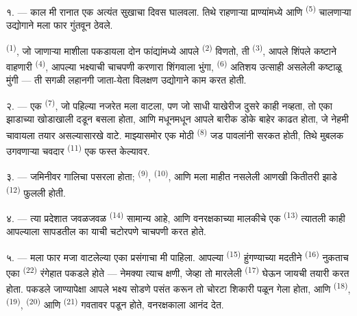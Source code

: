 \VUsaut{3.0mm}
\VUsaut{3.0mm}

\VUsaut{3.0mm}

१. --- काल मी रानात एक अत्यंत सुखाचा दिवस घालवला. तिथे राहणाऱ्या प्राण्यांमध्ये आणि
 \textsuperscript{(5)} चालणाऱ्या उद्योगाने मला फार गुंतवून ठेवले.

 \textsuperscript{(1)}, जो जाणाऱ्या माशीला पकडायला दोन फांद्यांमध्ये आपले
 \textsuperscript{(2)} विणतो, ती  \textsuperscript{(3)}, आपले शिंपले
कष्टाने वाहणारी  \textsuperscript{(4)}, आपल्या भक्ष्याची चाचपणी करणारा
शिंगवाला भुंगा,  \textsuperscript{(6)} अतिशय उत्साही असलेली कष्टाळू मुंगी —
ती सगळी लहानगी जाता-येता विलक्षण उद्योगाने काम करत होती.

२. --- एक  \textsuperscript{(7)}, जो पहिल्या नजरेत मला  वाटला, पण जो
साधी  याखेरीज दुसरे काही नव्हता, तो एका झाडाच्या खोडाखाली दडून बसला होता, आणि
मधूनमधून आपले बारीक डोके बाहेर काढत होता, जे नेहमी चावायला तयार असल्यासारखे वाटे. माझ्यासमोर
एक मोठी  \textsuperscript{(8)} जड पावलांनी सरकत होती, तिथे मुबलक
उगवणाऱ्या चवदार  \textsuperscript{(11)} एक फस्त केल्यावर.

३. --- जमिनीवर  गालिचा पसरला होता; 
\textsuperscript{(9)},  \textsuperscript{(10)}, आणि मला माहीत नसलेली आणखी
कितीतरी झाडे  \textsuperscript{(12)} फुलली होती.

४. --- त्या प्रदेशात  जवळजवळ  \textsuperscript{(14)} सामान्य
आहे, आणि वनरक्षकाच्या मालकीचे एक  \textsuperscript{(13)} त्यातली काही
आपल्याला सापडतील का याची चटोरपणे चाचपणी करत होते.

\VUsaut{3.0mm}
\VUsaut{3.0mm}

५. --- मला फार मजा वाटलेल्या एका प्रसंगाचा  मी पाहिला. आपल्या
 \textsuperscript{(15)} हुंगण्याच्या मदतीने
 \textsuperscript{(16)} नुकताच एका 
\textsuperscript{(22)} रंगेहात पकडले होते — नेमक्या त्याच क्षणी, जेव्हा तो मारलेली
 \textsuperscript{(17)} घेऊन जायची तयारी करत होता. पकडले जाण्यापेक्षा आपले
भक्ष्य सोडणे पसंत करून तो चोरटा शिकारी पळून गेला होता, आणि 
\textsuperscript{(18)},  \textsuperscript{(19)}, 
\textsuperscript{(20)} आणि  \textsuperscript{(21)} गवतावर पडून होते,
वनरक्षकाला आनंद देत.


